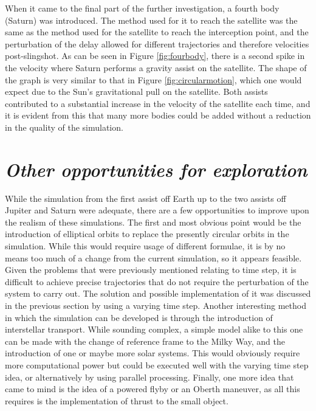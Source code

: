\documentclass[12pt, english]{report}
\begin{document}
{When it came to the final part of the further investigation, a fourth body (Saturn) was introduced. The method used for it to reach the satellite was the same as the method used for the satellite to reach the interception point, and the perturbation of the delay allowed for different trajectories and therefore velocities post-slingshot. As can be seen in Figure \ref{fig:fourbody}, there is a second spike in the velocity where Saturn performs a gravity assist on the satellite. The shape of the graph is very similar to that in Figure \ref{fig:circularmotion}, which one would expect due to the Sun's gravitational pull on the satellite. Both assists contributed to a substantial increase in the velocity of the satellite each time, and it is evident from this that many more bodies could be added without a reduction in the quality of the simulation.
}

\section{\textsl{Other opportunities for exploration}}
\normalsize{\noindent While the simulation from the first assist off Earth up to the two assists off Jupiter and Saturn were adequate, there are a few opportunities to improve upon the realism of these simulations. The first and most obvious point would be the introduction of elliptical orbits to replace the presently circular orbits in the simulation. While this would require usage of different formulae, it is by no means too much of a change from the current simulation, so it appears feasible. Given the problems that were previously mentioned relating to time step, it is difficult to achieve precise trajectories that do not require the perturbation of the system to carry out. The solution and possible implementation of it was discussed in the previous section by using a varying time step. Another interesting method in which the simulation can be developed is through the introduction of interstellar transport. While sounding complex, a simple model alike to this one can be made with the change of reference frame to the Milky Way, and the introduction of one or maybe more solar systems. This would obviously require more computational power but could be executed well with the varying time step idea, or alternatively by using parallel processing. Finally, one more idea that came to mind is the idea of a powered flyby or an Oberth maneuver, as all this requires is the implementation of thrust to the small object. }

%
\end{document}
